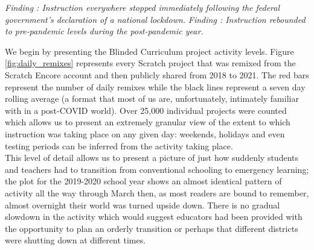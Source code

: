\documentclass[sigconf,manuscript,review,anonymous]{acmart} %
\newcommand{\Scratchencore}[0]{Blinded Curriculum}
\begin{document}
\textit{Finding : Instruction everywhere stopped immediately following the federal government’s declaration of a national lockdown.}
\textit{Finding : Instruction rebounded to pre-pandemic levels during the post-pandemic year.}

We begin by presenting the \Scratchencore{} project activity levels. Figure \ref{fig:daily_remixes}
 represents every Scratch project that was remixed from the Scratch Encore account and 
 then publicly shared from 2018 to 2021. The red bars represent the number of daily remixes 
 while the black lines represent a seven day rolling average (a format that most of us are, 
 unfortunately, intimately familiar with in a post-COVID world). Over 25,000 individual 
 projects were counted which allows us to present an extremely granular view of the extent 
 to which instruction was taking place on any given day: weekends, holidays and even 
 testing periods can be inferred from the activity taking place.\\
This level of detail allows us to present a picture of just how suddenly students and teachers
 had to transition from conventional schooling to emergency learning; the plot for the 
 2019-2020 school year shows an almost identical pattern of activity all the way through 
 March then, as most readers are bound to remember, almost overnight their world was 
 turned upside down. There is no gradual slowdown in the activity which would suggest 
 educators had been provided with the opportunity to plan an orderly transition or perhaps 
 that different districts were shutting down at different times.
\end{document}
